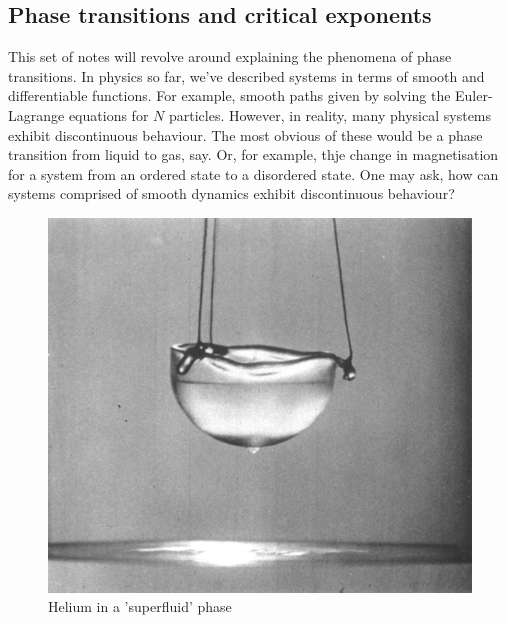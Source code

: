 \subsection{Phase transitions and critical exponents} 
This set of notes will revolve around explaining the phenomena of phase transitions. In physics so far, we've described systems in terms of smooth and differentiable functions. For example, smooth paths given by solving the Euler-Lagrange equations for $N$ particles. However, in reality, many physical systems exhibit discontinuous behaviour. The most obvious of these would be a phase transition from liquid to gas, say. Or, for example, thje change in magnetisation for a system from an ordered state to a disordered state. One may ask, how can systems comprised of smooth dynamics exhibit discontinuous behaviour? 

\begin{figure}[h]
	\centering
	\includegraphics[scale=0.1]{Liquid_helium_Rollin_film.jpg}
	\caption{Helium in a 'superfluid' phase}
\end{figure}

